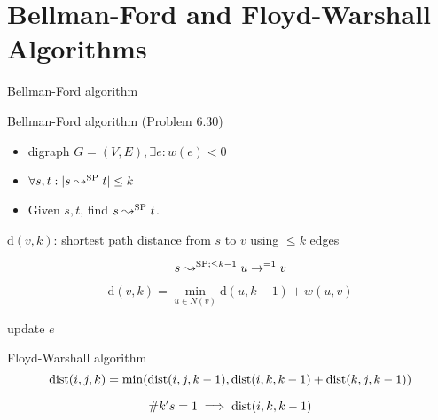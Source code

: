 \section{Bellman-Ford and Floyd-Warshall Algorithms}

\begin{frame}{Bellman-Ford algorithm}
  \begin{exampleblock}{Bellman-Ford algorithm (Problem 6.30)}
	\begin{itemize}
	  \item digraph $G = (V, E), \exists e: w(e) < 0$
	  \item $\forall s, t: |s \leadsto^{\text{SP}} t| \le k$
	  \item Given $s,t$, find $s \leadsto^{\text{SP}} t$.
	\end{itemize}
  \end{exampleblock}

  $\text{d}(v,k)$: shortest path distance from $s$ to $v$ using $\le k$ edges

  \[
	s \leadsto^{\text{SP}; \le k-1} u \to^{=1} v
  \]

  \[
	\text{d}(v, k) = \min_{u \in N(v)} \text{d}(u, k-1) + w(u,v)
  \]

  \begin{center}
	\begin{minipage}{0.50\linewidth}
	  \begin{algorithmic}[c]
			\State update $e$
		  \EndFor
		\EndFor
	  \end{algorithmic}
	\end{minipage}
  \end{center}
\end{frame}
\begin{frame}{Floyd-Warshall algorithm}
  \[
	\text{dist}(i,j,k) = \min(\text{dist}(i,j,k-1), \text{dist}(i,k,k-1) + \text{dist}(k,j,k-1))
  \]

  \[
	\# k's = 1 \implies \text{dist}(i,k,k-1)
  \]
\end{frame}
